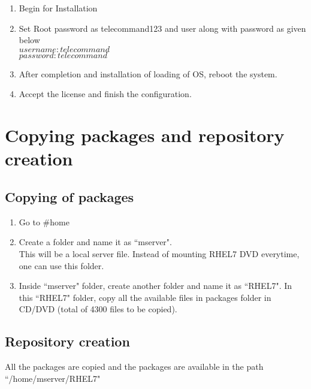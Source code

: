 \begin{enumerate}
\begin{enumerate}
		\end{enumerate}
	\item [\textbullet] Begin for Installation
	\item [\textbullet] Set Root password as telecommand123 and user along with password  as given below \\
			$username	: telecommand$ \\
			$password	: telecommand$
	\item [\textbullet] After completion and installation of loading of OS, reboot the system.
	\item [\textbullet] Accept the license and finish the configuration.		
\end{enumerate}

\section{Copying packages and repository creation}
\subsection{Copying of packages}

\begin{enumerate}
	\item [\textbullet] Go to $\#$home  
	\item [\textbullet] Create a folder and name it as ``mserver". \\ This will be a local server file. Instead of mounting RHEL7 DVD everytime, one can use this folder.
	\item [\textbullet] Inside ``mserver" folder, create another folder and name it as ``RHEL7". In this ``RHEL7" folder, copy all the available files in packages folder in CD/DVD  (total of 4300 files to be copied).
\end{enumerate}

\subsection{Repository creation}
All the packages are copied and the packages are available in the path ``/home/mserver/RHEL7"


